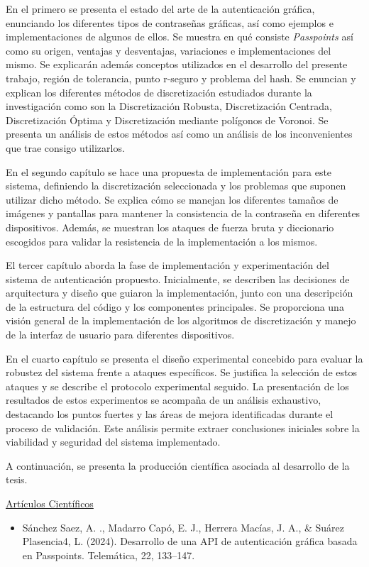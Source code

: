 En el primero se presenta el estado del arte de la autenticación gráfica, enunciando los diferentes tipos de contraseñas gráficas, así como ejemplos e implementaciones de algunos de ellos. Se muestra en qué consiste \textit{Passpoints} así como su origen, ventajas y desventajas, variaciones e implementaciones del mismo. Se explicarán además conceptos utilizados en el desarrollo del presente trabajo, región de tolerancia, punto r-seguro y problema del hash. Se enuncian y explican los diferentes métodos de discretización estudiados durante la investigación como son la Discretización Robusta, Discretización Centrada, Discretización Óptima y Discretización mediante polígonos de Voronoi. Se presenta un análisis de estos métodos así como un análisis de los inconvenientes que trae consigo utilizarlos.


En el segundo capítulo se hace una propuesta de implementación para este sistema, definiendo la discretización seleccionada y los problemas que suponen utilizar dicho método. Se explica cómo se manejan los diferentes tamaños de imágenes y pantallas para mantener la consistencia de la contraseña en diferentes dispositivos. Además, se muestran los ataques de fuerza bruta y diccionario escogidos para validar la resistencia de la implementación a los mismos.

El tercer capítulo aborda la fase de implementación y experimentación del sistema de autenticación propuesto. Inicialmente, se describen las decisiones de arquitectura y dise\~no que guiaron la implementación, junto con una descripción de la estructura del código y los componentes principales. Se proporciona una visión general de la implementación de los algoritmos de discretización y manejo de la interfaz de usuario para diferentes dispositivos. 

En el cuarto cap\'itulo se presenta el diseño experimental concebido para evaluar la robustez del sistema frente a ataques específicos. Se justifica la selección de estos ataques y se describe el protocolo experimental seguido. La presentación de los resultados de estos experimentos se acompaña de un análisis exhaustivo, destacando los puntos fuertes y las áreas de mejora identificadas durante el proceso de validación. Este análisis permite extraer conclusiones iniciales sobre la viabilidad y seguridad del sistema implementado.

A continuaci\'on, se presenta la producci\'on cient\'ifica asociada al desarrollo de la tesis.

\underline{Art\'iculos Cient\'ificos}
\begin{itemize}
	\item Sánchez Saez, A. ., Madarro Capó, E. J., Herrera Macías, J. A., \& Suárez Plasencia4, L. (2024). Desarrollo de una API de autenticaci\'on gr\'afica basada en Passpoints. Telemática, 22, 133–147.\\
\end{itemize}



